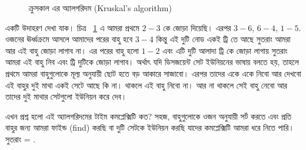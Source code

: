\begin{figure}[ht!]
\centering
{}
\caption{ক্রুসকাল এর অ্যালগরিদম (Kruskal's algorithm)}
\label{fig:kruskal}
\end{figure}

একটি উদাহরণ দেখা যাক। চিত্র ~\ref{fig:kruskal} এ আমরা প্রথমে $2-3$ কে জোড়া দিয়েছি। এরপর $3-6$, $6-4$, $1-5$. ওজনের ঊর্ধ্বক্রমে আসলে আমাদের পরের বাহু হবে $3-4$ কিন্তু এই দুটি নোড একই ট্রি তে আছে সুতরাং আমরা আর এই বাহু জোড়া লাগাব না। এর পরের বাহু হলো $1-2$ এবং এটি দুটি আলাদা ট্রি কে জোড়া লাগায় সুতরাং আমরা এই বাহু নিব এবং ট্রি দুটিকে জোড়া লাগাব। অর্থাৎ যদি ডিসজয়েন্ট সেট ইউনিয়নের ভাষায় বলতে হয়, তাহলে প্রথমে আমরা বাহুগুলোকে মূল্য অনুযায়ী ছোট হতে বড় আকারে সাজাবো। এরপর তাদের একে একে নিবো আর দেখবো এই বাহুর দুই মাথা একই সেটে আছে কি না। থাকলে এই বাহু নিবো না। আর না থাকলে সেই বাহু নেবো আর তাদের দুই মাথার সেটগুলো ইউনিয়ন করে দেব।

এখন প্রশ্ন হলো এই অ্যালগরিদমের টাইম কমপ্লেক্সিটি কত? সহজ, বাহুগুলোকে ওজন অনুযায়ী সর্ট করতে  এবং প্রতি বাহুর জন্য আমরা ফাইন্ড (find) করছি বা দুটি সেটকে ইউনিয়ন করছি যাদের কমপ্লেক্সিটি আমরা  ধরে নিতে পারি। সুতরাং  = .



